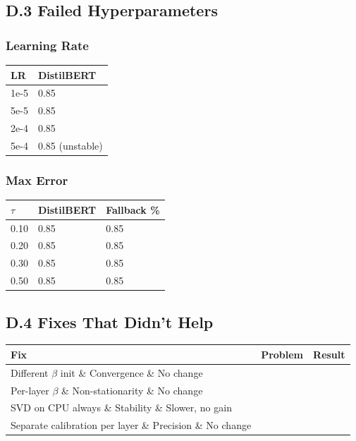 \subsection{D.3 Failed Hyperparameters}

\subsubsection{Learning Rate}

\begin{table}[H]
\centering
\small
\begin{tabular}{ll}
\toprule
\textbf{LR} & \textbf{DistilBERT} \\
\midrule
1e-5 & 0.85 \\
5e-5 & 0.85 \\
2e-4 & 0.85 \\
5e-4 & 0.85 (unstable) \\
\bottomrule
\end{tabular}
\end{table}

\subsubsection{Max Error}

\begin{table}[H]
\centering
\small
\begin{tabular}{lll}
\toprule
\textbf{$\tau$} & \textbf{DistilBERT} & \textbf{Fallback \%} \\
\midrule
0.10 & 0.85 & 0.85 \\
0.20 & 0.85 & 0.85 \\
0.30 & 0.85 & 0.85 \\
0.50 & 0.85 & 0.85 \\
\bottomrule
\end{tabular}
\end{table}

\subsection{D.4 Fixes That Didn't Help}

\begin{table}[H]
\centering
\small
\begin{tabular}{lll}
\toprule
\textbf{Fix} & \textbf{Problem} & \textbf{Result} \\
\midrule
Different $\beta$ init \& Convergence \& No change \\
Per-layer $\beta$ \& Non-stationarity \& No change \\
SVD on CPU always \& Stability \& Slower, no gain \\
Separate calibration per layer \& Precision \& No change \\
\bottomrule
\end{tabular}
\end{table}

